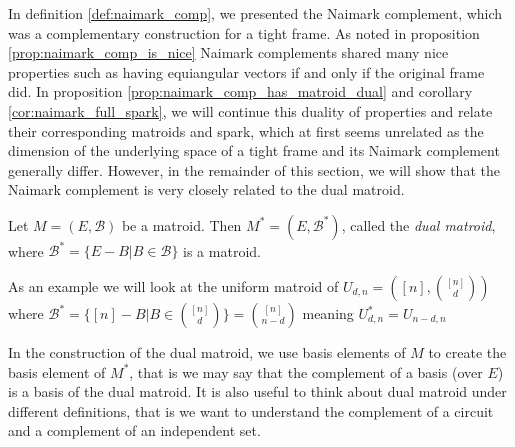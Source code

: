In definition \ref{def:naimark_comp}, we presented the Naimark complement, which was a complementary construction for a tight frame. As noted in proposition \ref{prop:naimark_comp_is_nice} Naimark complements shared many nice properties such as having equiangular vectors if and only if the original frame did. In proposition \ref{prop:naimark_comp_has_matroid_dual} and corollary \ref{cor:naimark_full_spark}, we will continue this duality of properties and relate their corresponding matroids and spark, which at first seems unrelated as the dimension of the underlying space of a tight frame and its Naimark complement generally differ. However, in the remainder of this section, we will show that the Naimark complement is very closely related to the dual matroid.

\begin{prop}
\label{prop:dual_matroid}
    Let $M=(E,\mathcal{B})$ be a matroid. Then $M^*=(E,\mathcal{B}^*)$, called the \textit{dual matroid}, where $\mathcal{B}^*=\{E-B|B\in\mathcal{B}\}$ is a matroid.
\end{prop}
\iftoggle{full}{
\begin{proof}
    Let $M=(E,\mathcal{B})$ and let $M^*=E,\mathcal{B}^*$ where $\mathcal{B}^*=\{E-B|B\in\mathcal{B}\}$. Notice that $\mathcal{B}^*$ because $\mathcal{B}$ is non-empty. Consider bases $B_1,B_2\in\mathcal{B}$ such that $B_1\neq B_2$ meaning $E-B_1\neq E-B_2$ Notice that this means for any $x\in (E-B_1)-(E-B_2)$ that $x\in B_2-B_1$ meaning there must exists some $y\in B_1-B_2=(E-B_2)-(E-B_1)$ such that $B_2-x+y$ is a basis in $\mathcal{B}$ meaning $E-B_2-y+x\in \mathcal{B}^*$. So $M^*$ is a matroid.
\end{proof}
}{}
\begin{example}
\label{ex:dual_uniform}
    As an example we will look at the uniform matroid of $U_{d,n}=([n],{[n]\choose d})$ where $\mathcal{B}^*=\{[n]-B|B\in {[n]\choose d}\}={[n]\choose n-d}$ meaning $U_{d,n}^*=U_{n-d,n}$
\end{example}
In the construction of the dual matroid, we use basis elements of $M$ to create the basis element of $M^*$, that is we may say that the complement of a basis (over $E$) is a basis of the dual matroid. It is also useful to think about dual matroid under different definitions, that is we want to understand the complement of a circuit and a complement of an independent set.

